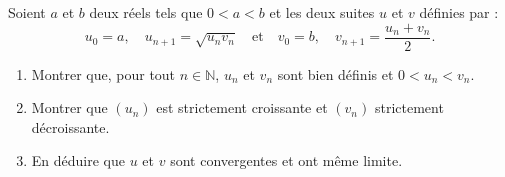 \documentclass[solutions]{exercices}
\begin{document}
\begin{exercice}[\di]
	Soient $a$ et $b$ deux réels tels que $0 < a < b$ et les deux suites $u$ et $v$ définies par :
	\[ u_0 = a, \quad u_{n+1} = \sqrt{u_n v_n} \quad \text{et} \quad v_0 = b, \quad v_{n+1} = \frac{u_n + v_n}{2}. \]
	\begin{enumerate}
		\item Montrer que, pour tout $n \in \mathbb N$, $u_n$ et $v_n$ sont bien définis et $0<u_n < v_n$.
		\item Montrer que $(u_n)$ est strictement croissante et $(v_n)$ strictement décroissante.
		\item En déduire que $u$ et $v$ sont convergentes et ont même limite.
	\end{enumerate}
\end{exercice}
\end{document}
